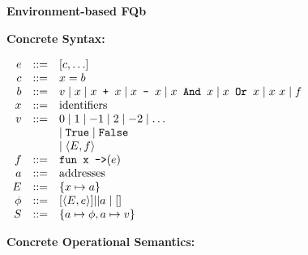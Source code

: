 \documentclass{article}
\begin{document}
\textbf{Environment-based FQb}

\textbf{Concrete Syntax: }

\begin{center}
    \begin{math}
        \begin{array}{r c l}
            e & ::= & \lbrack c, \ldots \rbrack
            \\
            c & ::= & x = b
            \\
             b & ::= & 
             	v
             	\mid x
                \mid x \texttt{ + } x
                \mid x \texttt{ - } x 
                \mid x \texttt{ And } x
                \mid x \texttt{ Or } x
                \mid x \ x \mid f
            \\
            x & ::= & \text{identifiers}
             \\
             v & ::= & 
             	0 \mid 1 \mid -1 \mid 2 \mid -2 \mid \ldots
             	\\&&
             	\mid \texttt{True} 
             	\mid \texttt{False}
             	\\&&
             	\mid \langle E, f \rangle
            \\
            f & ::= & \texttt{fun x ->} (e)
            \\
            a & ::= & \text{addresses}
            \\
            E & ::= & \{ x \mapsto a \}
            \\
            \phi & ::= & \lbrack \langle E, e \rangle \rbrack || a 
            \mid \lbrack\rbrack 
            \\
            S & ::= & \{ a \mapsto \phi, a \mapsto v \}
             
\end{array}
\end{math}
\end{center}
\textbf{Concrete Operational Semantics: }
\end{document}
